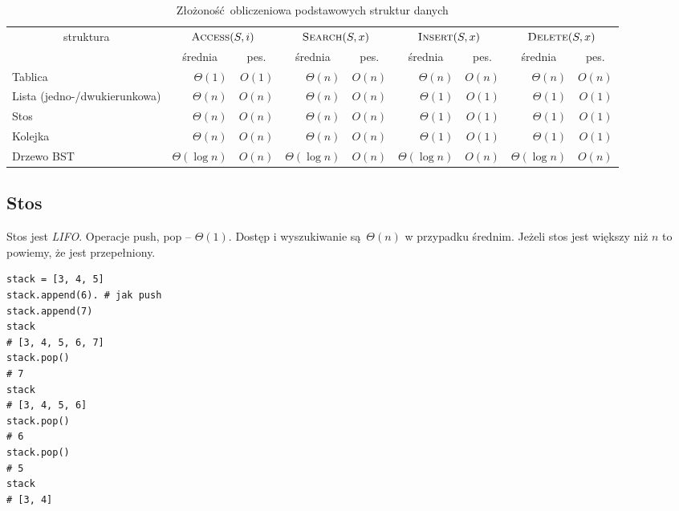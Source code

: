 \documentclass[10pt, oneside]{article}
\theoremstyle{remark}
\begin{document}
\begin{table}[]
\caption{Złożoność obliczeniowa podstawowych struktur danych}
\centering
\begin{tabular}{lrrrrrrrr}
\toprule
\multicolumn{1}{c}{\multirow{2}{*}{struktura}} & \multicolumn{2}{c}{$\Call{Access}{S, i}$} & \multicolumn{2}{c}{$\Call{Search}{S, x}$} & \multicolumn{2}{c}{$\Call{Insert}{S, x}$} & \multicolumn{2}{c}{$\Call{Delete}{S, x}$} \\ \cline{2-9} 
\multicolumn{1}{c}{} & \multicolumn{1}{c}{średnia} & \multicolumn{1}{c}{pes.} & \multicolumn{1}{c}{średnia} & \multicolumn{1}{c}{pes.} & \multicolumn{1}{c}{średnia} & \multicolumn{1}{c}{pes.} & \multicolumn{1}{c}{średnia} & \multicolumn{1}{c}{pes.} \\ \hline
Tablica & $\Theta(1)$ & $O(1)$ & $\Theta(n)$ & $O(n)$ & $\Theta(n)$ & $O(n)$ & $\Theta(n)$ & $O(n)$ \\
Lista (jedno-/dwukierunkowa) & $\Theta(n)$ & $O(n)$ & $\Theta(n)$ & $O(n)$ & $\Theta(1)$ & $O(1)$ & $\Theta(1)$ & $O(1)$ \\
Stos & $\Theta(n)$ & $O(n)$ & $\Theta(n)$ & $O(n)$ & $\Theta(1)$ & $O(1)$ & $\Theta(1)$ & $O(1)$ \\
Kolejka & $\Theta(n)$ & $O(n)$ & $\Theta(n)$ & $O(n)$ & $\Theta(1)$ & $O(1)$ & $\Theta(1)$ & $O(1)$ \\
Drzewo BST & $\Theta(\log n)$ & $O(n)$ & $\Theta(\log n)$ & $O(n)$ & $\Theta(\log n)$ & $O(n)$ & $\Theta(\log n)$ & $O(n)$ \\ 
\bottomrule
\end{tabular}
\end{table}

\subsection{Stos}

Stos jest \emph{LIFO}. Operacje push, pop -- $\Theta(1)$. 
Dostęp i wyszukiwanie są $\Theta(n)$ w przypadku średnim.
Jeżeli stos jest większy niż $n$ to powiemy, że jest przepełniony.

\begin{verbatim}
stack = [3, 4, 5]
stack.append(6). # jak push
stack.append(7)
stack
# [3, 4, 5, 6, 7]
stack.pop()
# 7
stack
# [3, 4, 5, 6]
stack.pop()
# 6
stack.pop()
# 5
stack
# [3, 4]
\end{verbatim}
\end{document}
